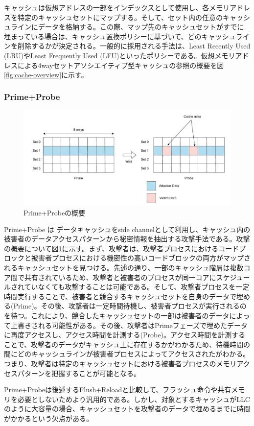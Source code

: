 キャッシュは仮想アドレスの一部をインデックスとして使用し、各メモリアドレスを特定のキャッシュセットにマップする。そして、セット内の任意のキャッシュラインにデータを格納する。この際、マップ先のキャッシュセットがすでに埋まっている場合は、キャッシュ置換ポリシーに基づいて、どのキャッシュラインを削除するかが決定される。一般的に採用される手法は、Least Recently Used (LRU)やLeast Frequently Used (LFU)といったポリシーである。仮想メモリアドレスによる4wayセットアソシエイティブ型キャッシュの参照の概要を図\ref{fig:cache-overview}に示す。

\subsubsection{Prime+Probe}

\begin{figure}[tb]
  \centering
  \includegraphics[width=\linewidth]{img/prime+probe.drawio.pdf}
  \caption{Prime+Probeの概要}\label{fig:prime-probe}
\end{figure}

Prime+Probe\cite{tromer2010efficient} は データキャッシュをside channelとして利用し、キャッシュ内の被害者のデータアクセスパターンから秘密情報を抽出する攻撃手法である。攻撃の概要について図\ref{fig:prime-probe}に示す。まず、攻撃者は、攻撃者プロセスにおけるコードブロックと被害者プロセスにおける機密性の高いコードブロックの両方がマップされるキャッシュセットを見つける。先述の通り、一部のキャッシュ階層は複数コア間で共有されているため、攻撃者と被害者のプロセスが同一コアにスケジュールされていなくても攻撃することは可能である\cite{liu2015last}。そして、攻撃者プロセスを一定時間実行することで、被害者と競合するキャッシュセットを自身のデータで埋める(Prime)。その後、攻撃者は一定時間待機し、被害者プロセスが実行されるのを待つ。これにより、競合したキャッシュセットの一部は被害者のデータによって上書きされる可能性がある。その後、攻撃者はPrimeフェーズで埋めたデータに再度アクセスし、アクセス時間を計測する(Probe)。アクセス時間を計測することで、攻撃者のデータがキャッシュ上に存在するかがわかるため、待機時間の間にどのキャッシュラインが被害者プロセスによってアクセスされたがわかる。つまり、攻撃者は特定のキャッシュセットにおける被害者プロセスのメモリアクセスパターンを把握することが可能となる。\par
Prime+Probeは後述するFlush+Reloadと比較して、フラッシュ命令や共有メモリを必要としないためより汎用的である。しかし、対象とするキャッシュがLLCのように大容量の場合、キャッシュセットを攻撃者のデータで埋めるまでに時間がかかるという欠点がある。

